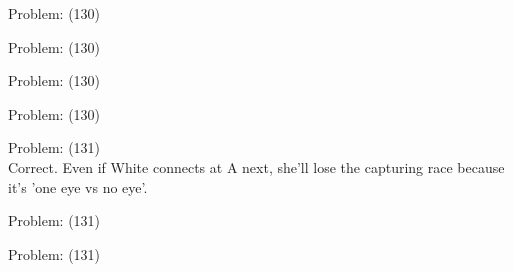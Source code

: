 \documentclass[11pt]{article}
\begin{document}
\begin{minipage}[t]{0.5\textwidth}
  {\centering
  
  Problem: (130)\\
  
  }
\end{minipage}
\begin{minipage}[t]{0.5\textwidth}
  {\centering
  
  Problem: (130)\\
  
  }
\end{minipage}
\begin{minipage}[t]{0.5\textwidth}
  {\centering
  
  Problem: (130)\\
  
  }
\end{minipage}
\begin{minipage}[t]{0.5\textwidth}
  {\centering
  
  Problem: (130)\\
  
  }
\end{minipage}
\begin{minipage}[t]{0.5\textwidth}
  {\centering
  
  Problem: (131)\\
  Correct. Even if White connects at A next, she'll lose the capturing race because it's 'one eye vs no eye'.\\
  }
\end{minipage}
\begin{minipage}[t]{0.5\textwidth}
  {\centering
  
  Problem: (131)\\
  
  }
\end{minipage}
\begin{minipage}[t]{0.5\textwidth}
  {\centering
  
  Problem: (131)\\
  
  }
\end{minipage}
\end{document}

